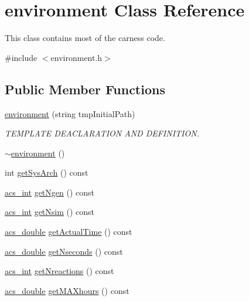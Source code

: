 \hypertarget{a00003}{\section{environment Class Reference}
\label{a00003}
}


This class contains most of the carness code.  




{\ttfamily \#include $<$environment.\-h$>$}

\subsection*{Public Member Functions}
\begin{DoxyCompactItemize}
\item 
\hyperlink{a00003_aa44bbabec52bf2d61a19685a30e68de1}{environment} (string tmp\-Initial\-Path)
\begin{DoxyCompactList}\small\item\em T\-E\-M\-P\-L\-A\-T\-E D\-E\-A\-C\-L\-A\-R\-A\-T\-I\-O\-N A\-N\-D D\-E\-F\-I\-N\-I\-T\-I\-O\-N. \end{DoxyCompactList}\item 
\hyperlink{a00003_ae323954bd5b674bf34d954c3f7b67629}{$\sim$environment} ()
\item 
int \hyperlink{a00003_a8cccdaf0b544847601797bf19367f1ee}{get\-Sys\-Arch} () const 
\item 
\hyperlink{a00016_a8d277355641a098190360234e2ebde35}{acs\-\_\-int} \hyperlink{a00003_afad68362d5f4ec0689941e3c1b92c2e8}{get\-Ngen} () const 
\item 
\hyperlink{a00016_a8d277355641a098190360234e2ebde35}{acs\-\_\-int} \hyperlink{a00003_a5a8522899b3e84b9c394d5d83d1e5c63}{get\-Nsim} () const 
\item 
\hyperlink{a00016_ab776853a005fcbf56af0424a2a4dd607}{acs\-\_\-double} \hyperlink{a00003_a14bad649a73246617361f0e1765f49f8}{get\-Actual\-Time} () const 
\item 
\hyperlink{a00016_ab776853a005fcbf56af0424a2a4dd607}{acs\-\_\-double} \hyperlink{a00003_aa850c2805e508b2aac4fbd5d5f9de77b}{get\-Nseconds} () const 
\item 
\hyperlink{a00016_a8d277355641a098190360234e2ebde35}{acs\-\_\-int} \hyperlink{a00003_a5cb9cf3968f19e23f6c54f4c915cf878}{get\-Nreactions} () const 
\item 
\hyperlink{a00016_ab776853a005fcbf56af0424a2a4dd607}{acs\-\_\-double} \hyperlink{a00003_af2b482132fc3ab299118f7a894bd53a2}{get\-M\-A\-Xhours} () const 

\end{DoxyCompactItemize}
